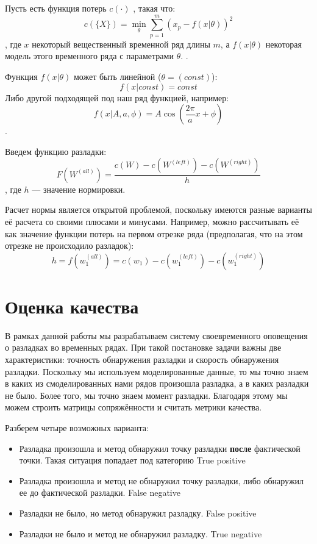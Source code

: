 \documentclass[%
12pt,
master,  %
natbib,      %
subf,        %
substylefile = spbu.rtx,
href,        %
colorlinks,  %
]{disser}
\begin{document}
Пусть есть функция потерь $c(\cdot)$ , такая что:
$$c(\{X\}) = \min_{\theta}{\sum_{p=1}^m(x_p - f(x | \theta))^2 }$$
, где $x$ некоторый вещественный временной ряд длины $m$, а $f(x | \theta)$ некоторая модель этого временного ряда с параметрами $\theta$.
.

Функция $f(x|\theta)$ может быть линейной ($\theta = (const)$):
$$ f(x | const) = const $$
Либо другой подходящей под наш ряд функцией, например:
$$ f(x | A, a, \phi) = A\cos(\frac{2\pi}{a}x + \phi) $$.

Введем функцию разладки:
$$ F(W^{(all)}) = \frac{c(W) - c(W^{(left)}) - c(W^{(right)})}{h} $$
, где $h$ --- значение нормировки.


Расчет нормы является открытой проблемой, поскольку имеются разные варианты её расчета со своими плюсами и минусами.
Например, можно рассчитывать её как значение функции потерь на первом отрезке ряда (предполагая, что на этом отрезке не происходило разладок):
$$ h = f(w_1^{(all)}) = c(w_1) - c(w_1^{(left)}) - c(w_1^{(right)})  $$

\section{Оценка качества}

В рамках данной работы мы разрабатываем систему своевременного оповещения о разладках во временных рядах. При такой постановке задачи важны две характеристики: точность обнаружения разладки и скорость обнаружения разладки. Поскольку мы используем моделированные данные, то мы точно знаем в каких из смоделированных нами рядов произошла разладка, а в каких разладки не было. Более того, мы точно знаем момент разладки. Благодаря этому мы можем строить матрицы сопряжённости и считать метрики качества.

Разберем четыре возможных варианта:
\begin{itemize}
	\item Разладка произошла и метод обнаружил точку разладки \textbf{после} фактической точки. Такая ситуация попадает под категорию True positive
	\item Разладка произошла и метод не обнаружил точку разладки, либо обнаружил ее до фактической разладки. False negative
	\item Разладки не было, но метод обнаружил разладку. False positive
	\item Разладки не было и метод не обнаружил разладку. True negative
\end{itemize}
\end{document}
